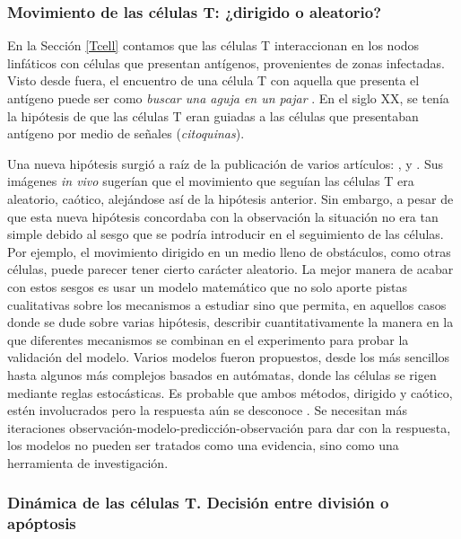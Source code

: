 \subsubsection{Movimiento de las células T: ¿dirigido o aleatorio?}

En la Sección \ref{Tcell} contamos que las células T interaccionan en los nodos linfáticos con células que presentan antígenos, provenientes de zonas infectadas. Visto desde fuera, el encuentro de una célula T con aquella que presenta el antígeno puede ser como \textit{buscar una aguja en un pajar} \citep{mathsModInmu}. En el siglo XX, se tenía la hipótesis de que las células T eran guiadas a las células que presentaban antígeno por medio de señales (\textit{citoquinas}). 

Una nueva hipótesis surgió a raíz de la publicación de varios artículos: \cite{Miller1869}, \cite{Stoll1873} y \cite{Bousso1876}. Sus imágenes \textit{in vivo} sugerían que el movimiento que seguían las células T era aleatorio, caótico, alejándose así de la hipótesis anterior. Sin embargo, a pesar de que esta nueva hipótesis concordaba con la observación la situación no era tan simple debido al sesgo que se podría introducir en el seguimiento de las células. Por ejemplo, el movimiento dirigido en un medio lleno de obstáculos, como otras células, puede parecer tener cierto carácter aleatorio. La mejor manera de acabar con estos sesgos es usar un modelo matemático que no solo aporte pistas cualitativas sobre los mecanismos a estudiar sino que permita, en aquellos casos donde se dude sobre varias hipótesis, describir cuantitativamente la manera en la que diferentes mecanismos se combinan en el experimento para probar la validación del modelo. 
Varios modelos fueron propuestos, desde los más sencillos hasta algunos más complejos basados en autómatas, donde las células se rigen mediante reglas estocásticas. Es probable que ambos métodos, dirigido y caótico, estén involucrados pero la respuesta aún se desconoce \citep{mathsModInmu}. Se necesitan más iteraciones observación-modelo-predicción-observación para dar con la respuesta, los modelos no pueden ser tratados como una evidencia, sino como una herramienta de investigación.

\subsubsection{Dinámica de las células T. Decisión entre división o apóptosis}
\label{cuestionAmodelizar}

